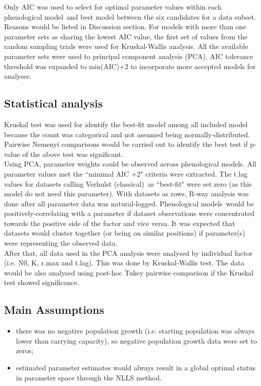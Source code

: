 \documentclass[a4paper, 11pt]{article}
\newcommand{\pml}{phenological model}
\newcommand{\pms}{phenological models}
\newcommand{\Pms}{Phenological models}
\newcommand{\fve}{Verhulst (classical)}
\begin{document}
	Only AIC\autocite{johnson2004model,akaike1998information,burnhamdr} was used to select for optimal parameter values within each \pml\ and best model between the six candidates for a data subset.  Reasons would be listed in Discussion section.  For models with more than one parameter sets as sharing the lowest AIC value, the first set of values from the random sampling trials were used for Kruskal-Wallis analysis.  All the available parameter sets were used to principal component analysis (PCA).  AIC tolerance threshold was expanded to min(AIC)+2\autocite{burnham2004multimodel} to incorporate more accepted models for analyses.
	
	\subsection*{Statistical analysis}
	Kruskal test was used for identify the best-fit model among all included model because the count was categorical and not assumed being normally-distributed.  Pairwise Nemenyi comparisons would be carried out to identify the best test if p-value of the above test was significant.\\
	
	Using PCA, parameter weights could be observed across \pms.  All parameter values met the ``minimal AIC +2"\autocite{burnham2004multimodel} criteria were extracted.  The t.lag values for datasets calling \fve\ as ``best-fit" were set zero (as this model do not need this parameter).  With datasets as rows, R-way analysis was done after all parameter data was natural-logged.  \Pms\ would be positively-correlating with a parameter if dataset observations were concentrated towards the positive side of the factor and vice versa.  It was expected that datasets would cluster together (or being on similar positions) if parameter(s) were representing the observed data.\\
	
	After that, all data used in the PCA analysis were analysed by individual factor (i.e. N0, K, r.max and t.lag).  This was done by Kruskal-Wallis test.  The data would be also analysed using post-hoc Tukey pairwise comparison if the Kruskal test showed significance.
	
	\subsection*{Main Assumptions}
	\begin{itemize}
		\item there was no negative population growth (i.e. starting population was always lower than carrying capacity), so negative population growth data were set to zeros;
		\item estimated parameter estimates would always result in a global optimal status in parameter space through the NLLS method.
	\end{itemize}
	
\end{document}
